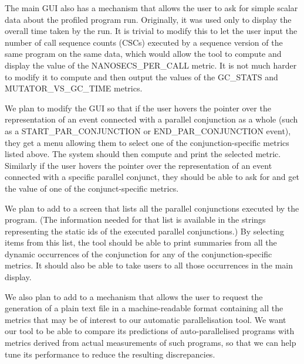 The main \tscope GUI also has a mechanism that allows the user
to ask for simple scalar data about the profiled program run.
Originally, it was used only to display the overall time taken by the run.
It is trivial to modify this to let the user input
the number of call sequence counts (CSCs)
executed by a sequence version of the same program on the same data,
which would allow the tool to compute and display
the value of the NANOSECS\_PER\_CALL metric.
It is not much harder to modify it to compute and then output
the values of the GC\_STATS and MUTATOR\_VS\_GC\_TIME metrics.

We plan to modify the \tscope GUI so that
if the user hovers the pointer over the representation
of an event connected with a parallel conjunction as a whole
(such as a START\_PAR\_CONJUNCTION or END\_PAR\_CONJUNCTION event),
they get a menu allowing them to select
one of the conjunction-specific metrics listed above.
The system should then compute and print the selected metric.
Similarly if the user hovers the pointer over the representation
of an event connected with a specific parallel conjunct,
they should be able to ask for and get
the value of one of the conjunct-specific metrics.

We plan to add to \tscope a screen
that lists all the parallel conjunctions executed by the program.
(The information needed for that list is available in the strings
representing the static ids of the executed parallel conjunctions.)
By selecting items from this list,
the tool should be able to print summaries
from all the dynamic occurrences of the conjunction
for any of the conjunction-specific metrics.
It should also be able to take users
to all those occurrences in the main display.

We also plan to add to \tscope
a mechanism that allows the user to request
the generation of a plain text file in a machine-readable format
containing all the metrics that may be of interest
to our automatic parallelisation tool.
We want our tool to be able to compare
its predictions of auto-parallelised programs
with metrics derived from actual measurements of such programs,
so that we can help tune its performance to reduce the resulting discrepancies.

